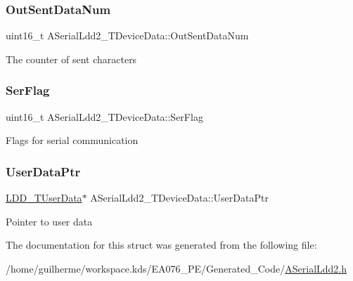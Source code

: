 \subsubsection{\texorpdfstring{Out\+Sent\+Data\+Num}{OutSentDataNum}}
{\footnotesize\ttfamily uint16\+\_\+t A\+Serial\+Ldd2\+\_\+\+T\+Device\+Data\+::\+Out\+Sent\+Data\+Num}

The counter of sent characters \mbox{\label{struct_a_serial_ldd2___t_device_data_a3a23d8d86c35f325643a62974866594f}} 
\subsubsection{\texorpdfstring{Ser\+Flag}{SerFlag}}
{\footnotesize\ttfamily uint16\+\_\+t A\+Serial\+Ldd2\+\_\+\+T\+Device\+Data\+::\+Ser\+Flag}

Flags for serial communication \mbox{\label{struct_a_serial_ldd2___t_device_data_a5845eb75d51c879a652b884f6c71e8a3}} 
\subsubsection{\texorpdfstring{User\+Data\+Ptr}{UserDataPtr}}
{\footnotesize\ttfamily \hyperlink{group___p_e___types__module_ga0b66a73f87238a782318aa0be7578e35}{L\+D\+D\+\_\+\+T\+User\+Data}$\ast$ A\+Serial\+Ldd2\+\_\+\+T\+Device\+Data\+::\+User\+Data\+Ptr}

Pointer to user data 

The documentation for this struct was generated from the following file\+:\begin{DoxyCompactItemize}
\item 
/home/guilherme/workspace.\+kds/\+E\+A076\+\_\+\+P\+E/\+Generated\+\_\+\+Code/\hyperlink{_a_serial_ldd2_8h}{A\+Serial\+Ldd2.\+h}\end{DoxyCompactItemize}
